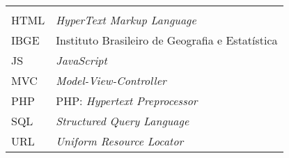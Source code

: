 
\begin{tabular}{ll}
\textbf{			} & \textbf{				}\\
HTML   & \it{HyperText Markup Language}\\
IBGE    & Instituto Brasileiro de Geografia e Estatística\\
JS	   & \it{JavaScript}\\
MVC	   & \it{Model-View-Controller}\\
PHP   & PHP: \it{Hypertext Preprocessor}\\
SQL	   & \it{Structured Query Language}\\
URL    & \it{Uniform Resource Locator}\\
\end{tabular}